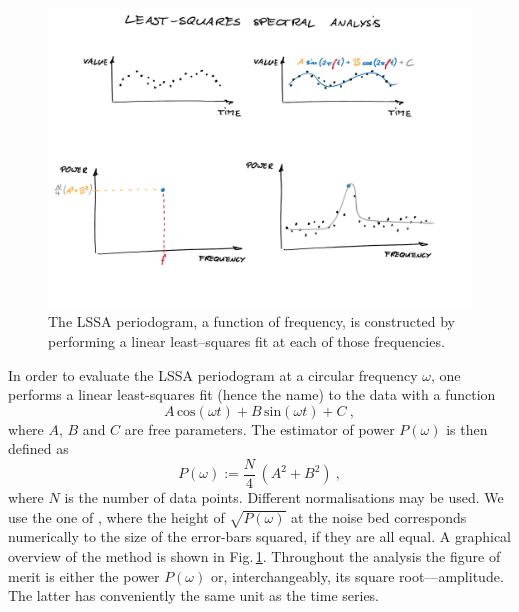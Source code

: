 \begin{figure}
  \centering \includegraphics[width=\linewidth]{gfx/axions/LSSA}
  \caption{The LSSA periodogram, a function of frequency, is constructed by performing a linear least--squares fit at each of those frequencies.}
  \label{fig:LSSA_overview}
\end{figure}

In order to evaluate the LSSA periodogram at a circular frequency $\omega$, one performs a linear least-squares fit (hence the name) to the data with a function
\begin{equation}
  A\,\mathrm{cos}(\omega t) + B\,\mathrm{sin}(\omega t) + C \ ,
\end{equation}
where $A$, $B$ and $C$ are free parameters. The estimator of power $P(\omega)$ is then defined as
\begin{equation}
  P(\omega) := \frac{N}{4} \, \left( A^2 + B^2 \right) \ ,
\end{equation}
where $N$ is the number of data points. Different normalisations may be used.
We use the one of \cite{Scargle1982}, where the height of $\sqrt{P(\omega)}$ at the noise bed corresponds numerically to the size of the error-bars squared, if they are all equal. A graphical overview of the method is shown in Fig.\,\ref{fig:LSSA_overview}. Throughout the analysis the figure of merit is either the power $P(\omega)$ or, interchangeably, its square root---amplitude. The latter has conveniently the same unit as the time series.

